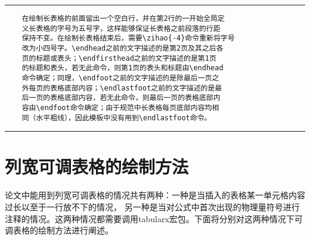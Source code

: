 \noindent\hrule
\begin{verbatim}
	在绘制长表格的前面留出一个空白行，并在第2行的一开始全局定
	义长表格的字号为五号字，这样能够保证长表格之前段落的行距
	保持不变。在绘制长表格结束后，需要\zihao{-4}命令重新将字号
	改为小四号字。\endhead之前的文字描述的是第2页及其之后各
	页的标题或表头；\endfirsthead之前的文字描述的是第1页
	的标题和表头，若无此命令，则第1页的表头和标题由\endhead
	命令确定；同理，\endfoot之前的文字描述的是除最后一页之
	外每页的表格底部内容；\endlastfoot之前的文字描述的是最
	后一页的表格底部内容，若无此命令，则最后一页的表格底部内
	容由\endfoot命令确定；由于规范中长表格每页底部内容均相
	同（水平粗线），因此模板中没有用到\endlastfoot命令。
\end{verbatim}

\noindent\hrule
\section{列宽可调表格的绘制方法}
论文中能用到列宽可调表格的情况共有两种：一种是当插入的表格某一单元格内容过长以至于一行放不下的情况，
另一种是当对公式中首次出现的物理量符号进行注释的情况。这两种情况都需要调用tabularx宏包。下面将分别对这两种情况下可调表格的绘制方法进行阐述。
